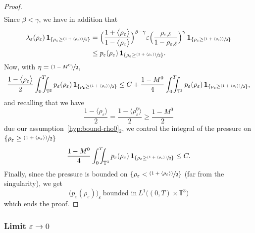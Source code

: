\documentclass[JEP,XML,SOM,Unicode,NoEqCountersInSection]{cedram}
\newcommand{\<}{\bigl\langle}
\renewcommand{\>}{\bigr\rangle}
\newcommand{\psfrac}[2]{\sfrac{(#1)}{#2}}
\newcommand{\intTTT}{\int_0^T\hspace*{-2.5mm}\int_{\TT}}
\newcommand{\labeleq}[1]{}
\theoremstyle{definition}
\theoremstyle{remark}
\newcommand{\TT}{\mathbb{T}^3}
\let\ep\varepsilon
\begin{document}
\begin{proof}
\begin{align*}
\end{align*}
Since $\beta < \gamma$, we have in addition that
\begin{align*}
\lambda_{\ep}(\rho_{\ep}) \,\mathbf{1}_{\{ \rho_{\ep} \geq \psfrac{1+\langle\rho_{\ep}\rangle}{2}\} }
& = \Bigl(\dfrac{1+\<\rho_{\ep}\>}{1-\<\rho_{\ep}\>}\Bigr)^{\beta-\gamma}\ep \Bigl(\dfrac{\rho_{\ep,\delta}}{1-\rho_{\ep,\delta}}\Bigr)^{\gamma} \,\mathbf{1}_{\{ \rho_{\ep} \geq \psfrac{1+\langle\rho_{\ep}\rangle}{2}\}} \\
& \leq p_{\ep}(\rho_{\ep}) \,\mathbf{1}_{\{ \rho_{\ep} \geq \psfrac{1+\langle\rho_{\ep}\rangle}{2}\} }.
\end{align*}
Now, with $\eta = \psfrac{1-M^0}{2}$,
\[
\dfrac{1-\<\rho_{\ep}\>}{2} \intTTT{p_{\ep}(\rho_{\ep})\,\mathbf{1}_{\{ \rho_{\ep} \geq \psfrac{1+\langle\rho_{\ep}\rangle}{2} \} } }\leq C + \dfrac{1-M^0}{4} \intTTT{p_{\ep}(\rho_{\ep}) \,\mathbf{1}_{\{ \rho_{\ep} \geq \psfrac{1+\langle\rho_{\ep}\rangle}{2}\} } },
\]
and recalling that we have
\[
\dfrac{1-\<\rho_{\ep}\>}{2} = \dfrac{1-\<\rho_{\ep}^0\>}{2} \geq \dfrac{1-M^0}{2}
\]
due our assumption~\eqref{hyp:bound-rho0}${}_2$,
we control the integral of the pressure on $\{ \rho_{\ep} \geq \psfrac{1+\langle\rho_{\ep}\rangle}{2}\}$
\[
\dfrac{1-M^0}{4}
\intTTT{p_{\ep}(\rho_{\ep})\,\mathbf{1}_{\{ \rho_{\ep} \geq \psfrac{1+\langle\rho_{\ep}\rangle}{2} \} } } \leq C.
\]
Finally, since the pressure is bounded on $\{ \rho_{\ep} < \psfrac{1+\langle\rho_{\ep}\rangle}{2}\}$ (far from the singularity), we get
\begin{equation*}\labeleq{bound-pep-L1}
\big(p_{\ep}(\rho_{\ep})\big)_\ep~ \text{bounded in} ~L^1\big((0,T)\times \TT \big)
\end{equation*}
which ends the proof.
\end{proof} 

\subsubsection{Limit $\ep\rightarrow 0$}
\end{document}
